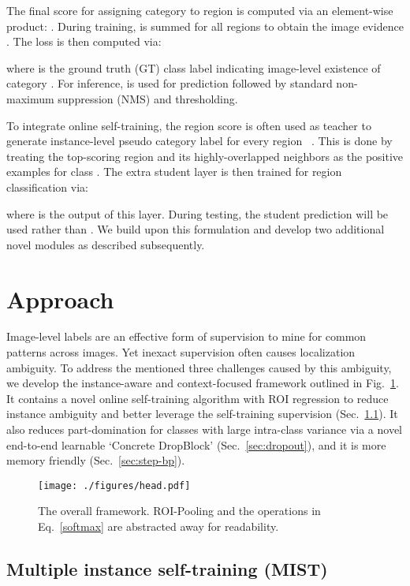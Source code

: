\documentclass[10pt,twocolumn,letterpaper]{article}
\begin{document}
The final score  for assigning category  to region  is computed via an element-wise product: . During training,  is summed for all regions  to obtain the image evidence . The loss is then computed via:

where  is the ground truth (GT) class label indicating image-level existence of category . For inference,  is used for prediction followed by standard non-maximum suppression (NMS) and thresholding.

To integrate online self-training, the region score  is often used as teacher to generate instance-level pseudo category label  for every region ~\cite{tang2018pcl, c-mil, Gao_2019_ICCV, Zeng_2019_ICCV, TangWWYLHY18}. This is done by treating the top-scoring region and its highly-overlapped neighbors as the positive examples for class . The extra student layer is then trained for region classification via:

where  is the output of this layer. During testing, the student prediction  will be used rather than . We build upon this formulation and develop two additional novel modules as described subsequently.
 \section{Approach}
\label{sec:approach}
Image-level labels are an effective form of supervision to mine for common patterns across images. Yet inexact supervision often causes localization ambiguity. To address the mentioned three challenges caused by this ambiguity, we develop the instance-aware and context-focused framework outlined in Fig.~\ref{fig:head}. It contains a novel online self-training algorithm with ROI regression to reduce instance ambiguity and better leverage the self-training supervision (Sec.~\ref{sec:refine}). It also reduces part-domination for classes with large intra-class variance via a novel end-to-end learnable `Concrete DropBlock' (Sec.~\ref{sec:dropout}), and it is more memory friendly (Sec.~\ref{sec:step-bp}). 

\begin{figure}[t]
\centering
\texttt{[image: ./figures/head.pdf]}
\caption{The overall framework. ROI-Pooling and the operations in Eq.~\eqref{softmax} are abstracted away for readability.}
\label{fig:head}
\vspace{-1em}
\end{figure}

\subsection{Multiple instance self-training (MIST)}
\label{sec:refine}
\end{document}
